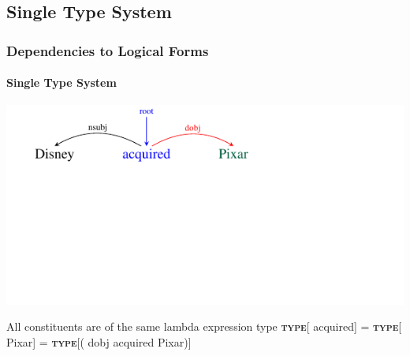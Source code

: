 \documentclass[mathserif,12pt]{beamer}
\newcommand\type[1]{\textbf{\textsc{type}}[#1]\xspace}
\begin{document}
\subsection{Single Type System}

\begin{frame}[noframenumbering]
\frametitle{Dependencies to Logical Forms}
\framesubtitle{Single Type System}
\vspace{-3em}
\begin{center}
\includegraphics[trim=2em 9.4em 10em 0em,clip=true,scale=1.3]{figures/pixar_dobj}


\end{center}

\vspace{1cm}

\begin{block}{\centering All constituents are of the same lambda expression type}
\centering
\vspace{0.1cm}
\type{{\color{blue} acquired}} =  \type{{\color{blue!40!green!60!black} Pixar}}  = \type{{({\color{red} dobj} {\color{blue} acquired} {\color{blue!40!green!60!black} Pixar})}}
\vspace{0.1cm}
\end{block}
\end{frame}
\end{document}
